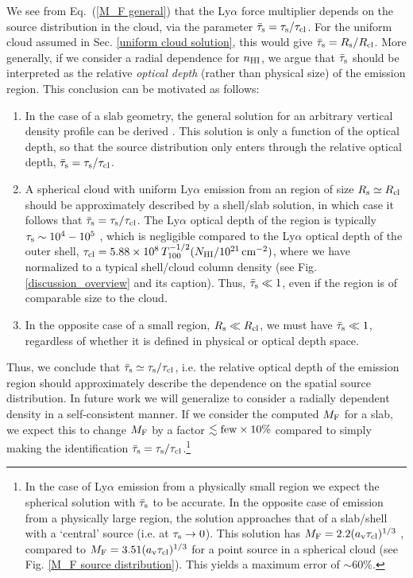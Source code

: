 \documentclass[fleqn,usenatbib]{mnras}
\newcommand{\taucl}{\tau_{\rm cl}}
\newcommand\HI{\ion{H}{I}\xspace} %
\newcommand\HII{\ion{H}{II}\xspace} %
\begin{document}
We see from Eq.~(\ref{M_F general}) that the Ly$\alpha$ force multiplier depends on the source distribution in the cloud, via the parameter $\Bar{\tau}_{\rm s} = \tau_{\rm s}/\tau_{\rm cl}$. For the uniform \HI cloud assumed in Sec. \ref{uniform cloud solution}, this would give $\Bar{\tau}_{\rm s} = R_{\rm s}/R_{\rm cl}$. More generally, if we consider a radial dependence for $n_{\rm HI}$, we argue that $\Bar{\tau}_{\rm s}$ should be interpreted as the relative \textit{optical depth} (rather than physical size) of the emission region. This conclusion can be motivated as follows:
\begin{enumerate}
    \item In the case of a slab geometry, the general solution for an arbitrary \HI vertical density profile can be derived \citep{Lao2020}. This solution is only a function of the optical depth, so that the source distribution only enters through the relative optical depth, $\Bar{\tau}_{\rm s} = \tau_{\rm s}/\taucl$.
    
    \item A spherical cloud with uniform Ly$\alpha$ emission from an \HII region of size $R_{\rm s} \simeq R_{\rm cl}$ should be approximately described by a shell/slab solution, in which case it follows that $\Bar{\tau}_{\rm s} = \tau_{\rm s}/\taucl$. The Ly$\alpha$ optical depth of the \HII region is typically $\tau_{\rm s} \sim 10^4 - 10^5$ \citep[e.g.][]{Draine2011}, which is negligible compared to the Ly$\alpha$ optical depth of the outer \HI shell, $\taucl = 5.88 \times 10^8 \, T_{100}^{-1/2} (N_{\rm HI}/10^{21} \, \textrm{cm}^{-2})$, where we have normalized to a typical \HI shell/cloud column density (see Fig. \ref{discussion_overview} and its caption). Thus, $\Bar{\tau}_{\rm s} \ll 1$, even if the \HII region is of comparable size to the cloud. 

    \item In the opposite case of a small \HII region, $R_{\rm s} \ll R_{\rm cl}$, we must have $\Bar{\tau}_{\rm s} \ll 1$, regardless of whether it is defined in physical or optical depth space. 
\end{enumerate}
Thus, we conclude that $\Bar{\tau}_{\rm s} \simeq \tau_{\rm s}/\taucl$, i.e. the relative optical depth of the emission region should approximately describe the dependence on the spatial source distribution. In future work we will generalize to consider a radially dependent \HI density in a self-consistent manner. If we consider the computed $M_{\rm F}$ for a slab, we expect this to change $M_{\rm F}$ by a factor $\lesssim \rm few \times 10\%$ compared to simply making the identification $\Bar{\tau}_{\rm s} = \tau_{\rm s}/\taucl$.\footnote{In the case of Ly$\alpha$ emission from a physically small \HII region we expect the spherical solution with $\Bar{\tau}_{\rm s}$ to be accurate. In the opposite case of emission from a physically large \HII region, the solution approaches that of a slab/shell with a `central' source (i.e. at $\tau_{\rm s} \rightarrow 0$). This solution has $M_{\rm F} = 2.2 (a_{\rm v} \taucl)^{1/3}$ \citep{Lao2020}, compared to $M_{\rm F} = 3.51 (a_{\rm v} \taucl)^{1/3}$ for a point source in a spherical cloud (see Fig. \ref{M_F source distribution}). This yields a maximum error of $\sim 60\%$.}
\end{document}
